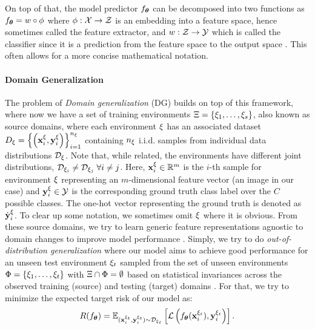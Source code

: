 On top of that, the model predictor $f_{\boldsymbol{\theta}}$ can be decomposed into two functions as $f_{\boldsymbol{\theta}} = w \circ \phi$ where $\phi: \mathcal{X} \rightarrow \mathcal{Z}$ is an embedding into a feature space, hence sometimes called the feature extractor, and $w: \mathcal{Z} \rightarrow \mathcal{Y}$ which is called the classifier since it is a prediction from the feature space to the output space \citep{gulrajani2020search, MotiianPAD17}. This often allows for a more concise mathematical notation.

\paragraph{Domain Generalization}
The problem of \emph{Domain generalization} (DG) builds on top of this framework, where now we have a set of training environments $\Xi = \left\{\xi_{1}, \ldots, \xi_{s} \right\}$, also known as source domains, where each environment $\xi$ has an associated dataset $D_{\xi}=\left\{\left(\mathbf{x}_i^{\xi}, \mathbf{y}_i^{\xi}\right)\right\}_{i=1}^{n_{\xi}}$ containing $n_\xi$ i.i.d. samples from individual data distributions $\mathcal{D}_\xi$. Note that, while related, the environments have different joint distributions, \ie $\mathcal{D}_{\xi_i}\neq \mathcal{D}_{\xi_j} \;\forall i\neq j$. Here, $\mathbf{x}_i^\xi \in \mathbb{R}^{m}$ is the $i$-th sample for environment $\xi$ representing an $m$-dimensional feature vector (\ie an image in our case) and $\mathbf{y}_i^\xi \in \mathcal{Y}$ is the corresponding ground truth class label over the $C$ possible classes. The one-hot vector representing the ground truth is denoted as $\dot{\mathbf{y}}_i^\xi$. To clear up some notation, we sometimes omit $\xi$ where it is obvious. From these source domains, we try to learn generic feature representations agnostic to domain changes to improve model performance \citep{seo2019learning}. Simply, we try to do \emph{out-of-distribution generalization} where our model aims to achieve good performance for an unseen test environment $\xi_t$ sampled from the set of unseen environments $\Phi = \left\{\xi_{1}, \ldots, \xi_{t}\right\}$ with $\Xi \cap \Phi =\emptyset$ based on statistical invariances across the observed training (source) and testing (target) domains \citep{gulrajani2020search, huang2020selfchallenging}. For that, we try to minimize the expected target risk of our model as:
\begin{equation}
\label{eq:domain_risk}
    R(f_{\boldsymbol{\theta}}) = \mathbb{E}_{(\mathbf{x}_i^{\xi_t}, \mathbf{y}_i^{\xi_t}) \sim \mathcal{D}_{\xi_t}}\left[\mathcal{L}\left(f_{\boldsymbol{\theta}}(\mathbf{x}_i^{\xi_t}), \mathbf{y}_i^{\xi_t}\right)\right].
\end{equation}
